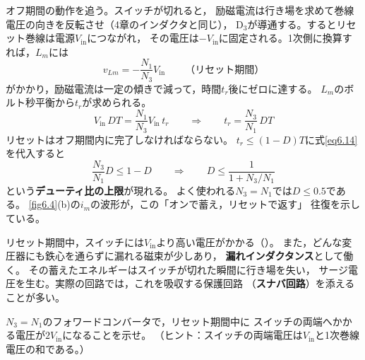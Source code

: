 オフ期間の動作を追う。スイッチが切れると，
励磁電流は行き場を求めて巻線電圧の向きを反転させ（4章のインダクタと同じ），
$\mathrm{D_3}$が導通する。するとリセット巻線は電源$V_{\mathrm{in}}$につながれ，
その電圧は$-V_{\mathrm{in}}$に固定される。1次側に換算すれば，$L_m$には
\begin{equation}
v_{Lm} = -\frac{N_1}{N_3}V_{\mathrm{in}} \qquad （リセット期間）
\label{eq6.13}
\end{equation}
がかかり，励磁電流は一定の傾きで減って，時間$t_r$後にゼロに達する。
$L_m$のボルト秒平衡から$t_r$が求められる。
\begin{equation}
V_{\mathrm{in}}\,DT = \frac{N_1}{N_3}V_{\mathrm{in}}\,t_r
\qquad\Rightarrow\qquad
t_r = \frac{N_3}{N_1}\,DT
\label{eq6.14}
\end{equation}
リセットはオフ期間内に完了しなければならない。
$t_r \le (1-D)T$に式\ref{eq6.14}を代入すると
\begin{equation}
\frac{N_3}{N_1}D \le 1-D
\qquad\Rightarrow\qquad
D \le \frac{1}{1 + N_3/N_1}
\label{eq6.15}
\end{equation}
という\textbf{デューティ比の上限}が現れる。
よく使われる$N_3 = N_1$では$D \le 0.5$である。
\ref{fig6.4}(b)の$i_m$の波形が，この「オンで蓄え，リセットで返す」
往復を示している。

\begin{注意}
リセット期間中，スイッチには$V_{\mathrm{in}}$より高い電圧がかかる（）。
また，どんな変圧器にも鉄心を通らずに漏れる磁束が少しあり，
\textbf{漏れインダクタンス}として働く。
その蓄えたエネルギーはスイッチが切れた瞬間に行き場を失い，
サージ電圧を生む。実際の回路では，これを吸収する保護回路
（\textbf{スナバ回路}）を添えることが多い。
\end{注意}

\begin{問}
\item $N_3 = N_1$のフォワードコンバータで，リセット期間中に
スイッチの両端へかかる電圧が$2V_{\mathrm{in}}$になることを示せ。
（ヒント：スイッチの両端電圧は$V_{\mathrm{in}}$と1次巻線電圧の和である。）
\end{問}


\section{}
\label{sec6.4}

